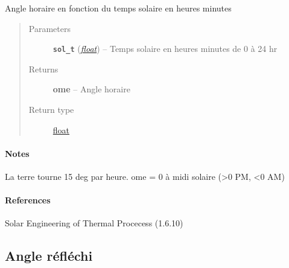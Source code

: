 \documentclass[letterpaper,10pt,english]{sphinxmanual}
\begin{document}
\begin{fulllineitems}
\label{python:solar_mod.angle_horaire}
Angle horaire en fonction du temps solaire en heures minutes
\begin{quote}\begin{description}
\item[{Parameters}] \leavevmode
\textbf{\texttt{sol\_t}} (\href{https://docs.python.org/library/functions.html\#float}{\emph{float}}) -- Temps solaire en heures minutes de 0 à 24 hr

\item[{Returns}] \leavevmode
\textbf{ome} -- Angle horaire

\item[{Return type}] \leavevmode
\href{https://docs.python.org/library/functions.html\#float}{float}

\end{description}\end{quote}
\paragraph{Notes}

La terre tourne 15 deg par heure.
ome = 0 à midi solaire (\textgreater{}0 PM, \textless{}0 AM)
\paragraph{References}

Solar Engineering of Thermal Procecess (1.6.10)

\end{fulllineitems}



\subsection{Angle réfléchi}
\label{python:angle-reflechi}
\end{document}
